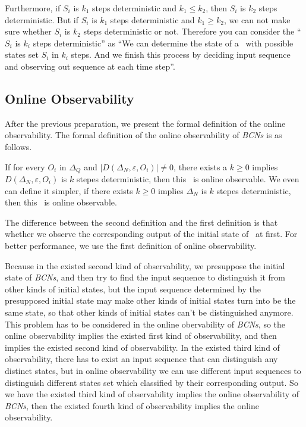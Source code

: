 Furthermore, if $S_i$ is $k_1$ steps deterministic and $k_1\leq k_2$, then $S_i$ is $k_2$ steps deterministic. But if $S_i$ is $k_1$ steps deterministic and $k_1\geq k_2$, we can not make sure whether $S_i$ is $k_2$ steps deterministic or not. Therefore you can consider the ``$S_i$ is $k_i$ steps deterministic'' as ``We can determine the state of a \BCN\ with possible states set $S_i$ in $k_i$ steps. And we finish this process by deciding input sequence and observing out sequence at each time step''. 
\subsection{Online Observability}
After the previous preparation, we present the formal definition of the online observability. The formal definition of the online observability of {\em BCNs} is as follows.
\begin{definition}
If for every  $O_i$ in $\Delta_Q$ and $|D\left(\Delta_N,\varepsilon, O_i\right)|\neq 0$, there exists a $ k \ge 0$ implies $D\left(\Delta_N,\varepsilon,O_i\right)$ is $k$ stepes deterministic, then this \BCN\ is online observable. We even can define it simpler, if there exists $k \ge 0$ implies $\Delta_N$ is $k$ stepes deterministic, then this \BCN\ is online observable. 
\end{definition}

The difference between the second definition and the first definition is that whether we observe the corresponding output of the initial state of \BCN\ at first. For better performance, we use the first definition of online observability.

Because in the existed second kind of observability, we presuppose the initial state of {\em BCNs}, and then try to find the input sequence to distinguish it from other kinds of initial states, but the input sequence determined by the presupposed initial state may make other kinds of initial states turn into be the same state, so that other kinds of initial states can't be distinguished anymore. This problem has to be considered in the online obervability of {\em BCNs}, so the online observability implies the existed first kind of observability, and then implies the existed second kind of observability. In the existed third kind of observability, there has to exist an input sequence that can distinguish any distinct states, but in online observability we can use different input sequences to distinguish different states set which classified by their corresponding output. So we have the existed third kind of observability implies the online observability of {\em BCNs}, then the existed fourth kind of observability implies the online observability.

